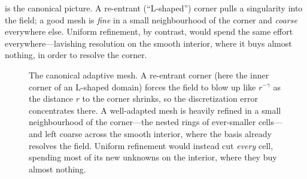  is the canonical picture. A re-entrant (``L-shaped'') corner
pulls a singularity into the field; a good mesh is \emph{fine} in a small
neighbourhood of the corner and \emph{coarse} everywhere else. Uniform refinement,
by contrast, would spend the same effort everywhere---lavishing resolution on the
smooth interior, where it buys almost nothing, in order to resolve the corner.

\begin{figure}[t]
\centering
{}
\caption[A mesh graded to a corner singularity]{The canonical adaptive mesh. A
re-entrant corner (here the inner corner of an L-shaped domain) forces the field to
blow up like $r^{-\gamma}$ as the distance $r$ to the corner shrinks, so the
discretization error concentrates there. A well-adapted mesh is heavily refined in a
small neighbourhood of the corner---the nested rings of ever-smaller cells---and
left coarse across the smooth interior, where the basis already resolves the field.
Uniform refinement would instead cut \emph{every} cell, spending most of its new
unknowns on the interior, where they buy almost nothing.}
\label{fig:cornermesh}
\end{figure}

